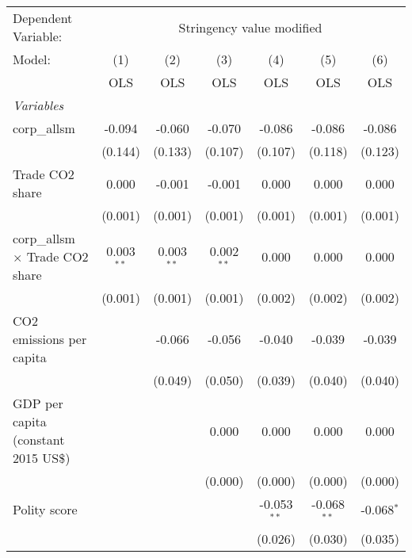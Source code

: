 
\begingroup
\centering
\begin{tabular}{lcccccc}
   \toprule
   Dependent Variable: & \multicolumn{6}{c}{Stringency value modified}\\
   Model:                                 & (1)          & (2)          & (3)          & (4)           & (5)           & (6)\\  
                                          &  OLS         & OLS          & OLS          & OLS           & OLS           & OLS\\  
   \midrule
   \emph{Variables}\\
   corp\_allsm                            & -0.094       & -0.060       & -0.070       & -0.086        & -0.086        & -0.086\\   
                                          & (0.144)      & (0.133)      & (0.107)      & (0.107)       & (0.118)       & (0.123)\\   
   Trade CO2 share                        & 0.000        & -0.001       & -0.001       & 0.000         & 0.000         & 0.000\\   
                                          & (0.001)      & (0.001)      & (0.001)      & (0.001)       & (0.001)       & (0.001)\\   
   corp\_allsm $\times$ Trade CO2 share   & 0.003$^{**}$ & 0.003$^{**}$ & 0.002$^{**}$ & 0.000         & 0.000         & 0.000\\   
                                          & (0.001)      & (0.001)      & (0.001)      & (0.002)       & (0.002)       & (0.002)\\   
   CO2 emissions per capita               &              & -0.066       & -0.056       & -0.040        & -0.039        & -0.039\\   
                                          &              & (0.049)      & (0.050)      & (0.039)       & (0.040)       & (0.040)\\   
   GDP per capita (constant 2015 US\$)    &              &              & 0.000        & 0.000         & 0.000         & 0.000\\   
                                          &              &              & (0.000)      & (0.000)       & (0.000)       & (0.000)\\   
   Polity score                           &              &              &              & -0.053$^{**}$ & -0.068$^{**}$ & -0.068$^{*}$\\   
                                          &              &              &              & (0.026)       & (0.030)       & (0.035)\\   

\end{tabular}
